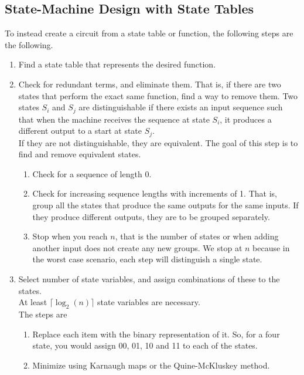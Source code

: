 \documentclass[nobib]{tufte-handout}
\begin{document}
\subsection{State-Machine Design with State Tables}
To instead create a circuit from a state table or function, the following steps
are the following.
\begin{enumerate}
    \item Find a state table that represents the desired function.
    \item Check for redundant terms, and eliminate them. That is, if there are two states
          that perform the exact same function, find a way to remove them. Two states
          $S_i$ and $S_j$ are distinguishable if there exists an input sequence such that
          when the machine receives the sequence at state $S_i$, it produces a different
          output to a start at state $S_j$.\\ If they are not distinguishable, they are
          equivalent. The goal of this step is to find and remove equivalent states.\\
          \begin{enumerate}
              \item Check for a sequence of length 0.
              \item Check for increasing sequence lengths with increments of 1. That is, group all
                    the states that produce the same outputs for the same inputs. If they produce
                    different outputs, they are to be grouped separately.
              \item Stop when you reach $n$, that is the number of states or when adding another
                    input does not create any new groups. We stop at $n$ because in the worst case
                    scenario, each step will distinguish a single state.
          \end{enumerate}
    \item Select number of state variables, and assign combinations of these to the
          states.\\ At least $\lceil \log_2(n)\rceil$ state variables are necessary.\\
          The steps are \begin{enumerate}
              \item Replace each item with the binary representation of it. So, for a four state, you would assign 00, 01, 10 and 11 to each of the states.
              \item Minimize using Karnaugh maps or the Quine-McKluskey method.

\end{enumerate}
\end{enumerate}
\end{document}

